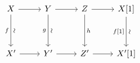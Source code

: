 \documentclass[12pt]{standalone}
\begin{document}
        $$

\begin{tikzcd}[row sep=huge]
X \arrow[d,"\sim"{sloped},"f"'] \arrow[r] & Y \arrow[d,"\sim"{sloped},"g"'] \arrow[r] & Z \arrow[d,"h"] \arrow[r] & X[1] \arrow[d,"\sim"{sloped},"f{[1]}"'] \\
X^\prime \arrow[r] & Y^\prime \arrow[r] & Z^\prime \arrow[r] & X^\prime[1]
\end{tikzcd}
        $$
        
\end{document}
